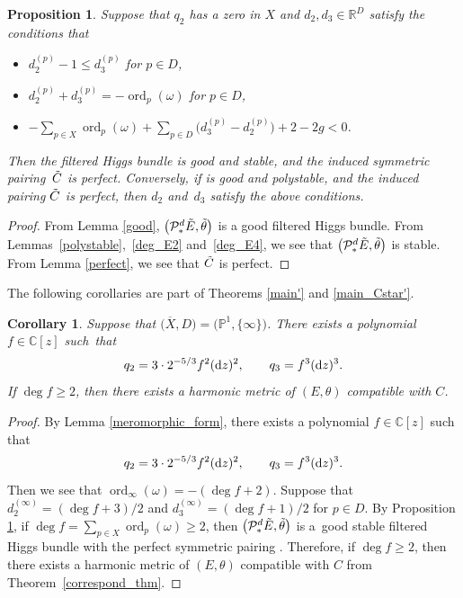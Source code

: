 \documentclass[10pt,a4paper]{amsart}
\numberwithin{equation}{section}
\newtheorem{Corollary}[Theorem]{Corollary}
\newtheorem{Proposition}[Theorem]{Proposition}
 { \theoremstyle{definition}
\newtheorem{Definition}[Theorem]{Definition}
\newtheorem{Note}[Theorem]{Note}
\newtheorem{Example}[Theorem]{Example}
\newtheorem{Remark}[Theorem]{Remark}

\newtheorem{Question}[Theorem]{Question}
\newtheorem{Assumption}[Theorem]{Assumption}}
\newcommand{\C}{\mathbb{C}}
\newcommand{\R}{\mathbb{R}}
\newcommand{\ps}{\mathbb{P}}
\newcommand{\ord}{\operatorname{ord}}
\begin{document}
\begin{Proposition}\label{main_prop}
 Suppose that $q_2$ has a zero in $X$ and $d_2, d_3\in \R^D$ satisfy the conditions that
 \begin{itemize}\itemsep=0pt
 \item $d^{(p)}_2-1\leq d^{(p)}_3$ for $p\in D$,
 \item $d^{(p)}_2 + d^{(p)}_3 = -\ord_p(\omega)$ for $p\in D$,
 \item $-\sum_{p\in X}\ord_p(\omega) + \sum_{p\in D} \bigl(d^{(p)}_3 - d^{(p)}_2\bigr) + 2-2g <0$.
 \end{itemize}
 Then the filtered Higgs bundle  is good and stable, and the induced symmetric pairing~$\Tilde{C}$ is perfect. Conversely, if  is good and polystable, and the induced pairing $\Tilde{C}$ is perfect, then $d_2$ and~$d_3$ satisfy the above conditions.
\end{Proposition}
\begin{proof}
 From Lemma \ref{good}, $\bigl(\mathcal{P}^d_{*}{\Tilde{E}},\Tilde{\theta}\bigr)$ is a good filtered Higgs bundle.
 From Lemmas~\ref{polystable},~\ref{deg_E2} and~\ref{deg_E4}, we see that $\bigl(\mathcal{P}^d_{*}{\Tilde{E}},\Tilde{\theta}\bigr)$ is stable. From Lemma \ref{perfect}, we see that $\Tilde{C}$ is perfect.
\end{proof}

The following corollaries are part of Theorems \ref{main'} and \ref{main_Cstar'}.
\begin{Corollary}\label{main_cor}
 Suppose that $\bigl(\overline{X},D\bigr)=\bigl(\ps^1,\{\infty\}\bigr)$. There exists a polynomial $f\in \C[z]$ such~that
 \begin{equation*}
 q_2 = 3\cdot 2^{-5/3}f^2 ({\rm d}z)^2, \qquad q_3 = f^3 ({\rm d}z)^3.
 \end{equation*}
 If $\deg{f}\geq 2$, then there exists a harmonic metric of $(E,\theta)$ compatible with $C$.
\end{Corollary}
\begin{proof}
 By Lemma \ref{meromorphic_form}, there exists a polynomial $f\in \C[z]$ such that
 \begin{equation*}
 q_2 = 3\cdot 2^{-5/3}f^2 ({\rm d}z)^2, \qquad q_3 = f^3 ({\rm d}z)^3.
 \end{equation*}
 Then we see that $\ord_{\infty}(\omega) = -(\deg{f} + 2 )$.
 Suppose that $d_2^{(\infty)} = (\deg{f} + 3 )/2$ and $d_3^{(\infty)} = (\deg{f} + 1 )/2$ for $p\in D$.
 By Proposition \ref{main_prop}, if $\deg{f} = \sum_{p\in X}\ord_p(\omega) \geq 2$, then $\bigl(\mathcal{P}^d_{*}{\Tilde{E}},\Tilde{\theta}\bigr)$ is a~good stable filtered Higgs bundle with the perfect symmetric pairing . Therefore, if $\deg{f} \geq 2$, then there exists a harmonic metric of $(E,\theta)$ compatible with $C$ from Theorem~\ref{correspond_thm}.
\end{proof}
\end{document}
